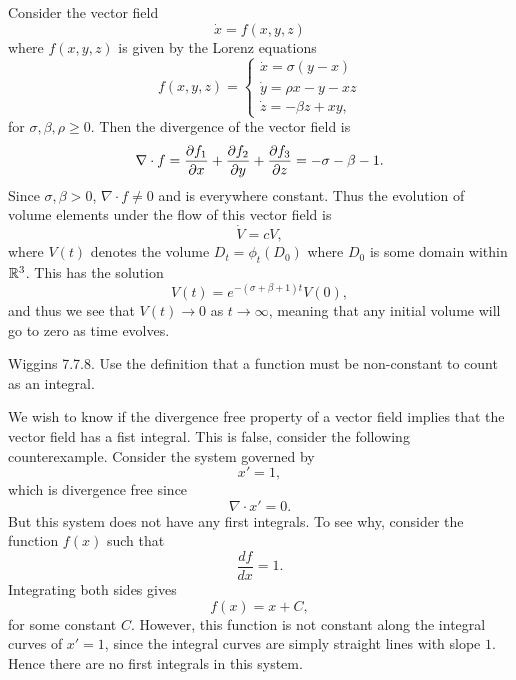 \documentclass[12pt]{report}
\begin{document}
\begin{solution}
    
    \noindent
    Consider the vector field
    \[ 
        \dot{x} = f(x,y,z)
    \]
    where $f(x,y,z)$ is given by the Lorenz equations
    \[
        f(x,y,z) = \begin{cases}
            \dot{x} = \sigma(y - x)\\
            \dot{y} = \rho x - y - xz\\
            \dot{z} = -\beta z + xy,
        \end{cases}
    \]
    for $\sigma, \beta, \rho \geq 0$. Then the divergence of the vector field is
    \[
        \nabla \cdot f = \frac{\partial f_1}{\partial x} + \frac{\partial f_2}{\partial y} + \frac{\partial f_3}{\partial z} = - \sigma - \beta - 1. 
    \] 
    Since $\sigma,\beta > 0$, $\nabla \cdot f \neq 0$ and is everywhere constant. Thus the evolution of volume elements under the flow of this vector field is 
    \[ 
        \dot{V} = cV,
    \]
    where $V(t)$ denotes the volume $D_t = \phi_t(D_0)$ where $D_0$ is some domain within ${\mathbb R}^3$. This has the solution
    \[ 
        V(t) = e^{-(\sigma + \beta + 1)t}V(0),
    \]
    and thus we see that $V(t) \to 0$ as $t \to \infty$, meaning that any initial volume will go to zero as time evolves. 
\end{solution}

\newpage



\begin{problem}
    Wiggins 7.7.8. Use the definition that a function must be non-constant to count as an integral.
\end{problem}

\begin{solution}
    
    \noindent
    We wish to know if the divergence free property of a vector field implies that the vector field has a fist integral. This is false, consider the following counterexample. Consider the system governed by
    \[ 
        x' = 1,
    \]
    which is divergence free since 
    \[ 
        \nabla \cdot x' = 0.
    \]
    But this system does not have any first integrals. To see why, consider the function $f(x)$ such that 
    \[ \frac{df}{dx} = 1.\]
    Integrating both sides gives 
    \[f(x) = x + C,\] 
    for some constant $C$. However, this function is not constant along the integral curves of $x' = 1$, since the integral curves are simply straight lines with slope $1$. Hence there are no first integrals in this system.
\end{solution}

\newpage
\end{document}
